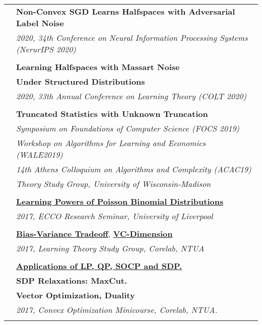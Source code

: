 \documentclass[letterpaper,11pt,oneside]{article}
\begin{document}
\begin{longtable}{@{} l l}
     &\textbf{Non-Convex SGD Learns Halfspaces with Adversarial Label Noise} \\
     & \emph{2020, 34th Conference on Neural Information Processing Systems (NerurIPS 2020)} \\
     & \\

     &\textbf{Learning Halfspaces with Massart Noise}\\
     &\textbf{Under Structured Distributions}\\
     & \emph{2020, 33th Annual Conference on Learning Theory (COLT 2020) } \\
     & \\

 &\textbf{Truncated Statistics with Unknown Truncation}\\
 &\emph{Symposium on Foundations of Computer Science (FOCS 2019)}\\
 &\emph{Workshop on Algorithms for Learning and Economics (WALE2019)}\\
 &\emph{14th Athens Colloquium on Algorithms and Complexity (ACAC19)}\\
 &\emph{Theory Study Group, University of Wisconsin-Madison}\\
 &\\

 &\href{https://vkonton.github.io/assets/talks/pbdPowers.pdf}
 {\textbf{Learning Powers of Poisson Binomial Distributions}}\\
 &\emph{2017, ECCO Research Seminar, University of Liverpool} \\
&\\

  &\href{https://vkonton.github.io/assets/talks/learning1.pdf}{\textbf{Bias-Variance Tradeoff}},
  \href{https://vkonton.github.io/assets/talks/learning2.pdf}{\textbf{VC-Dimension}}\\
  &\emph{2017, Learning Theory Study Group, Corelab, NTUA}\\
  &\\

  &\href{https://vkonton.github.io/talks/}{\textbf{Applications of LP, QP, SOCP and SDP.}}\\
  &\textbf{SDP Relaxations: MaxCut.}\\
  &\textbf{Vector Optimization, Duality} \\
  &\emph{2017, Convex Optimization Minicourse, Corelab, NTUA.}\\
  &\\




\end{longtable}
\end{document}
